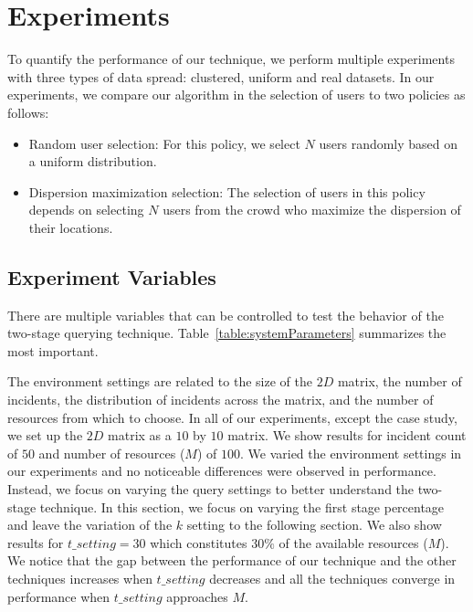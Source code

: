 \documentclass{acm_proc_article-sp}
\begin{document}
\section{Experiments}
To quantify the performance of our technique, we perform multiple experiments with three types of data spread: clustered, uniform and real datasets. In our experiments, we compare our algorithm in the selection of users to two policies as follows:
\begin{itemize}
\item Random user selection: For this policy, we select $N$ users randomly based on a uniform distribution.
\item Dispersion maximization selection: The selection of users in this policy depends on selecting $N$ users from the crowd who maximize the dispersion of their locations.
\end{itemize}
\subsection{Experiment Variables}
There are multiple variables that can be controlled to test the behavior of the two-stage querying technique. Table~\ref{table:systemParameters} summarizes the most important.


The environment settings are related to the size of the $2D$ matrix, the number of incidents, the distribution of incidents across the matrix, and the number of resources from which to choose. In all of our experiments, except the case study, we set up the $2D$ matrix as a $10$ by $10$ matrix. We show results for incident count of $50$ and number of resources ($M$) of $100$. We varied the environment settings in our experiments and no noticeable differences were observed in performance. Instead, we focus on varying the query settings to better understand the two-stage technique. In this section, we focus on varying the first stage percentage and leave the variation of the $k$ setting to the following section. We also show results for $t\_setting = 30$ which constitutes $30\%$ of the available resources ($M$). We notice that the gap between the performance of our technique and the other techniques increases when $t\_setting$ decreases and all the techniques converge in performance when $t\_setting$ approaches $M$. \par
\end{document}
